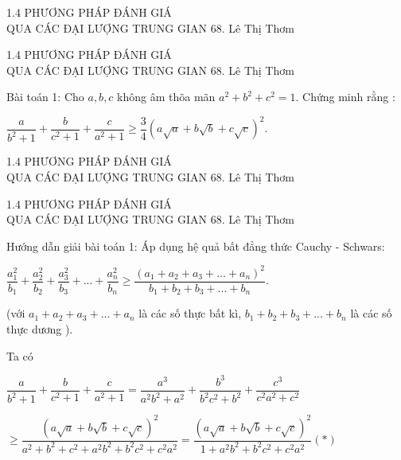 \begin{frame}{1.4 PHƯƠNG PHÁP ĐÁNH GIÁ\\ QUA CÁC ĐẠI LƯỢNG TRUNG GIAN \hspace{3cm}  68. Lê Thị Thơm} 

\end{frame}

\begin{frame}{1.4 PHƯƠNG PHÁP ĐÁNH GIÁ\\ QUA CÁC ĐẠI LƯỢNG TRUNG GIAN \hspace{3cm}  68. Lê Thị Thơm} 
\begin{block}{Bài toán 1:}
 Cho $a, b,c $ không âm thõa mãn $a^2 +b^2 +c^2 = 1$. Chứng minh rằng :
 
$ \dfrac{a}{b^2 + 1} + \dfrac{b}{c^2 + 1} + \dfrac{c}{a^2 + 1} \geqslant \dfrac{3}{4}  ( a \sqrt{a} + b \sqrt{b} + c \sqrt{c}) ^2 .$
 
\end{block} 
\end{frame}

\begin{frame}{1.4 PHƯƠNG PHÁP ĐÁNH GIÁ\\ QUA CÁC ĐẠI LƯỢNG TRUNG GIAN \hspace{3cm}  68. Lê Thị Thơm}

\end{frame}

\begin{frame}{1.4 PHƯƠNG PHÁP ĐÁNH GIÁ\\ QUA CÁC ĐẠI LƯỢNG TRUNG GIAN \hspace{3cm}  68. Lê Thị Thơm}
\begin{block}{Hướng dẫn giải bài toán 1:}
 Áp dụng hệ quả bất đẳng thức Cauchy - Schwars:
 
$ \dfrac{a_1^2}{b_1} + \dfrac{a_2^2}{b_2 } + \dfrac{a_3^2}{b_3 } + ...+ \dfrac{a_n^2}{b_n }\geqslant \dfrac{ (a_1 + a_2 +a_3 + ... +a_n)^2 }{b_1 + b_2 +b_3 + ... +b_n}.$ 

(với $ a_1 + a_2 +a_3 + ... +a_n $ là các số thực bất kì, $b_1 + b_2 +b_3 + ... +b_n$ là các số thực dương ).

Ta có 

 $\dfrac{a}{b^2 + 1} + \dfrac{b}{c^2 + 1} + \dfrac{c}{a^2 + 1} = \dfrac{a^3}{a^2b^2 + a^2} + \dfrac{b^3}{b^2c^2 + b^2} + \dfrac{c^3}{c^2a^2 + c^2}$
 
$\geqslant\dfrac{ (a \sqrt{a} + b \sqrt{b} + c \sqrt{c})^2 }{ a^2 + b^2  + c^2 + a^2b^2 + b^2c^2 + c^2a^2 } = \dfrac{ (a \sqrt{a} + b \sqrt{b} + c \sqrt{c})^2 }{ 1+ a^2b^2 + b^2c^2 + c^2a^2 } (*)$ 
\end{block} 
\end{frame}

